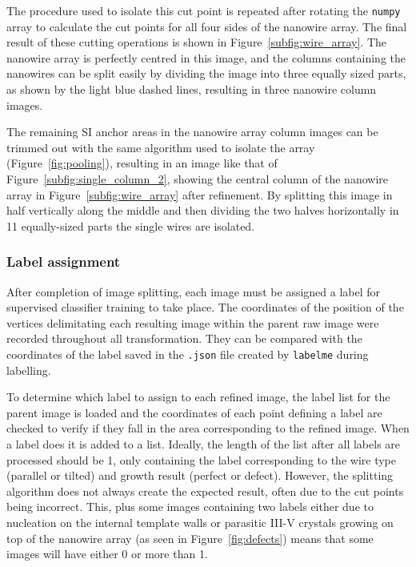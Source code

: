 The procedure used to isolate this cut point is repeated after rotating the \texttt{numpy} array to calculate the cut points for all four sides of the nanowire array. The final result of these cutting operations is shown in Figure~\ref{subfig:wire_array}. The nanowire array is perfectly centred in this image, and the columns containing the nanowires can be split easily by dividing the image into three equally sized parts, as shown by the light blue dashed lines, resulting in three nanowire column images.

The remaining \acl{SI} anchor areas in the nanowire array column images can be trim\-med out with the same algorithm used to isolate the array (Figure~\ref{fig:pooling}), resulting in an image like that of Figure~\ref{subfig:single_column_2}, showing the central column of the nanowire array in Figure~\ref{subfig:wire_array} after refinement. By splitting this image in half vertically along the middle and then dividing the two halves horizontally in \num{11} equally-sized parts the single wires are isolated.

\subsubsection{Label assignment}

After completion of image splitting, each image must be assigned a label for supervised classifier training to take place. The coordinates of the position of the vertices delimitating each resulting image within the parent raw image were recorded throughout all transformation. They can be compared with the coordinates of the label saved in the \texttt{.json} file created by \texttt{labelme} during labelling.

To determine which label to assign to each refined image, the label list for the parent image is loaded and the coordinates of each point defining a label are checked to verify if they fall in the area corresponding to the refined image. When a label does it is added to a list. Ideally, the length of the list after all labels are processed should be \num{1}, only containing the label corresponding to the wire type (parallel or tilted) and growth result (perfect or defect). However, the splitting algorithm does not always create the expected result, often due to the cut points being incorrect. This, plus some images containing two labels either due to nucleation on the internal template walls or parasitic III-V crystals growing on top of the nanowire array (as seen in Figure~\ref{fig:defects}) means that some images will have either \num{0} or more than \num{1}. 

